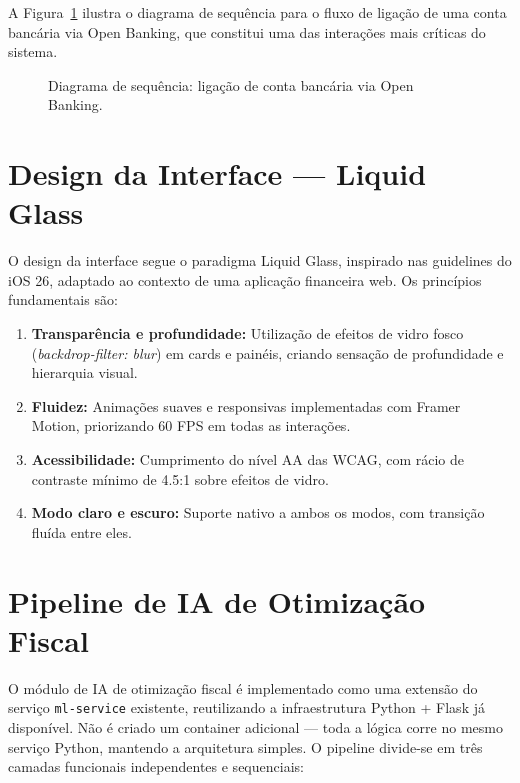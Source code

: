 A Figura~\ref{fig:sequencia-openbanking} ilustra o diagrama de sequência para o fluxo de ligação de uma conta bancária via Open Banking, que constitui uma das interações mais críticas do sistema.

\begin{figure}[H]
\centering

\caption{Diagrama de sequência: ligação de conta bancária via Open Banking.}
\label{fig:sequencia-openbanking}
\end{figure}


\section{Design da Interface --- Liquid Glass}
\label{sec:arq-design}

O design da interface segue o paradigma Liquid Glass, inspirado nas guidelines do iOS 26, adaptado ao contexto de uma aplicação financeira web. Os princípios fundamentais são:

\begin{enumerate}
    \item \textbf{Transparência e profundidade:} Utilização de efeitos de vidro fosco (\textit{backdrop-filter: blur}) em cards e painéis, criando sensação de profundidade e hierarquia visual.
    \item \textbf{Fluidez:} Animações suaves e responsivas implementadas com Framer Motion, priorizando 60 FPS em todas as interações.
    \item \textbf{Acessibilidade:} Cumprimento do nível AA das \ac{WCAG}, com rácio de contraste mínimo de 4.5:1 sobre efeitos de vidro.
    \item \textbf{Modo claro e escuro:} Suporte nativo a ambos os modos, com transição fluída entre eles.
\end{enumerate}



\section{Pipeline de IA de Otimização Fiscal}
\label{sec:arq-fiscal-ia}

O módulo de \ac{IA} de otimização fiscal é implementado como uma extensão do serviço \texttt{ml-service} existente, reutilizando a infraestrutura Python + Flask já disponível. Não é criado um container adicional --- toda a lógica corre no mesmo serviço Python, mantendo a arquitetura simples. O pipeline divide-se em três camadas funcionais independentes e sequenciais:

